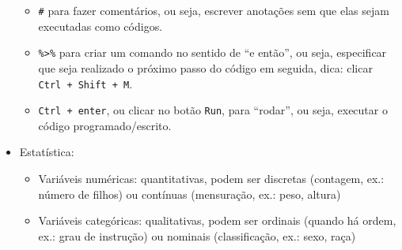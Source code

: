 \documentclass[
  brazil,
]{book}
\providecommand{\tightlist}{%
  \setlength{\itemsep}{0pt}\setlength{\parskip}{0pt}}
\begin{document}
\begin{itemize}
  \begin{itemize}
  \tightlist
  \item
    \texttt{\#} para fazer comentários, ou seja, escrever anotações sem que elas sejam executadas como códigos.
  \item
    \texttt{\%\textgreater{}\%} para criar um comando no sentido de ``e então'', ou seja, especificar que seja realizado o próximo passo do código em seguida, dica: clicar \texttt{Ctrl\ +\ Shift\ +\ M}.
  \item
    \texttt{Ctrl\ +\ enter}, ou clicar no botão \texttt{Run}, para ``rodar'', ou seja, executar o código programado/escrito.
  \end{itemize}
\item
  Estatística:

  \begin{itemize}
  \tightlist
  \item
    Variáveis numéricas: quantitativas, podem ser discretas (contagem, ex.: número de filhos) ou contínuas (mensuração, ex.: peso, altura)
  \item
    Variáveis categóricas: qualitativas, podem ser ordinais (quando há ordem, ex.: grau de instrução) ou nominais (classificação, ex.: sexo, raça)
  \end{itemize}
\end{itemize}

  
\end{document}
